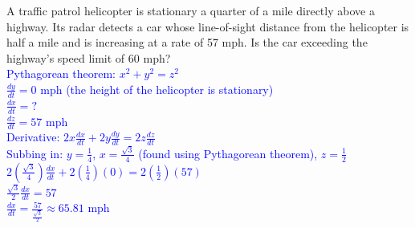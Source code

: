 \documentclass{ximera}
\begin{document}
\begin{exercise}
    A traffic patrol helicopter is stationary a quarter of a mile directly above a highway.  Its radar detects a car whose line-of-sight distance from the helicopter is half a mile and is increasing at a rate of 57 mph.  Is the car exceeding the highway's speed limit of 60 mph?\\
    \textcolor{blue}{Pythagorean theorem: $x^2+y^2=z^2$\\
    $\frac{dy}{dt}=0$ mph (the height of the helicopter is stationary)\\
    $\frac{dx}{dt}=?$ \\
    $\frac{dz}{dt}=57$ mph\\
    Derivative: $2x\frac{dx}{dt}+2y\frac{dy}{dt}=2z\frac{dz}{dt}$\\
    Subbing in: $y=\frac{1}{4}$, $x=\frac{\sqrt{3}}{4}$ (found using Pythagorean theorem), $z=\frac{1}{2}$\\
    $2(\frac{\sqrt{3}}{4})\frac{dx}{dt}+2(\frac{1}{4})(0)=2(\frac{1}{2})(57)$\\
    $\frac{\sqrt{3}}{2}\frac{dx}{dt}=57$\\
    $\frac{dx}{dt}=\frac{57}{\frac{\sqrt{3}}{2}}\approx 65.81$ mph}
\end{exercise}
   
\end{document}
